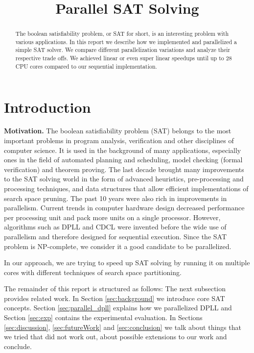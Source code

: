 \documentclass[letterpaper]{article}
\title{Parallel SAT Solving}
\newcommand{\mypar}[1]{{\bf #1.}}
\begin{document}
%
\maketitle
%

\begin{abstract}
The boolean satisfiability problem, or SAT for short, is an interesting problem with various applications.
In this report we describe how we implemented and parallelized a simple SAT solver.
We compare different parallelization variations and analyze their respective trade offs.
We achieved linear or even super linear speedups until up to 28 CPU cores compared to our sequential implementation.
\end{abstract}

\section{Introduction}\label{sec:intro}

\mypar{Motivation}
The boolean satisfiability problem (SAT) belongs to the most important problems in program analysis, verification and other disciplines of computer science.
It is used in the background of many applications, especially ones in the field of automated planning and scheduling, model checking (formal verification) and theorem proving.
The last decade brought many improvements to the SAT solving world in the form of advanced heuristics, pre-processing and processing techniques, and data structures that allow efficient implementations of search space pruning.
The past 10 years were also rich in improvements in parallelism.
Current trends in computer hardware design decreased performance per processing unit and pack more units on a single processor.
However, algorithms such as DPLL and CDCL were invented before the wide use of parallelism and therefore designed for sequential execution.
Since the SAT problem is NP-complete, we consider it a good candidate to be parallelized.

In our approach, we are trying to speed up SAT solving by running it on multiple cores with different techniques of search space partitioning.

The remainder of this report is structured as follows:
The next subsection provides related work.
In Section \ref{sec:background} we introduce core SAT concepts.
Section \ref{sec:parallel_dpll} explains how we parallelized DPLL and Section \ref{sec:exp} contains the experimental evaluation.
In Sections \ref{sec:discussion}, \ref{sec:futureWork} and \ref{sec:conclusion} we talk about things that we tried that did not work out, about possible extensions to our work and conclude.
\end{document}

